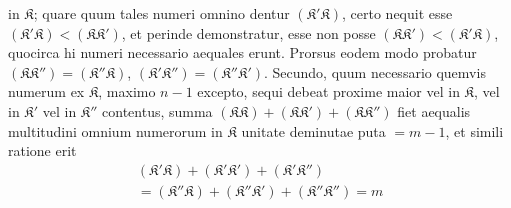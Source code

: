 in \(\mathfrak K\); quare quum tales numeri omnino dentur \((\mathfrak K'\mathfrak K)\), certo nequit esse \((\mathfrak K'\mathfrak K)<(\mathfrak K\mathfrak K')\), et perinde demonstratur, esse non posse \((\mathfrak K\mathfrak K')<(\mathfrak K'\mathfrak K)\), quocirca hi numeri necessario aequales erunt. Prorsus eodem modo probatur \((\mathfrak K\mathfrak K'')=(\mathfrak K''\mathfrak K)\), \((\mathfrak K'\mathfrak K'')=(\mathfrak K''\mathfrak K')\). Secundo, quum necessario quemvis numerum ex \(\mathfrak K\), maximo \(n-1\) excepto, sequi debeat proxime maior vel in \(\mathfrak K\), vel in \(\mathfrak K'\) vel in \(\mathfrak K''\) contentus, summa \((\mathfrak K\mathfrak K)+(\mathfrak K\mathfrak K')+(\mathfrak K\mathfrak K'')\) fiet aequalis multitudini omnium numerorum in \(\mathfrak K\) unitate deminutae puta \(=m-1\), et simili ratione erit \[\begin{aligned}(\mathfrak K'\mathfrak K)+(\mathfrak K'\mathfrak K')+(\mathfrak K'\mathfrak K'')\\{}=(\mathfrak K''\mathfrak K)+(\mathfrak K''\mathfrak K')+(\mathfrak K''\mathfrak K'')=m\end{aligned}\]

